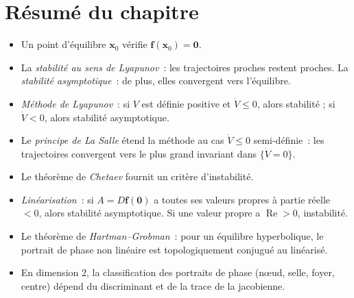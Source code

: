 \documentclass[12pt,a4paper,openany]{book}
\theoremstyle{definition}
\theoremstyle{plain}
\theoremstyle{remark}
\begin{document}
\section*{Résumé du chapitre}

\begin{itemize}
  \item Un point d'équilibre $\mathbf{x}_0$ vérifie
    $\mathbf{f}(\mathbf{x}_0)=\mathbf{0}$.
  \item La \emph{stabilité au sens de Lyapunov}~: les trajectoires
    proches restent proches. La \emph{stabilité asymptotique}~:
    de plus, elles convergent vers l'équilibre.
  \item \emph{Méthode de Lyapunov}~: si $V$ est définie positive
    et $\dot{V}\leq 0$, alors stabilité ; si $\dot{V}<0$, alors
    stabilité asymptotique.
  \item Le \emph{principe de La Salle} étend la méthode au cas
    $\dot{V}\leq 0$ semi-définie~: les trajectoires convergent
    vers le plus grand invariant dans $\{\dot{V}=0\}$.
  \item Le théorème de \emph{Chetaev} fournit un critère
    d'instabilité.
  \item \emph{Linéarisation}~: si $A=D\mathbf{f}(\mathbf{0})$ a
    toutes ses valeurs propres à partie réelle $<0$, alors
    stabilité asymptotique. Si une valeur propre a
    $\operatorname{Re}>0$, instabilité.
  \item Le théorème de \emph{Hartman--Grobman}~: pour un équilibre
    hyperbolique, le portrait de phase non linéaire est
    topologiquement conjugué au linéarisé.
  \item En dimension $2$, la classification des portraits de phase
    (n\oe ud, selle, foyer, centre) dépend du discriminant et de la
    trace de la jacobienne.
\end{itemize}


\end{document}
